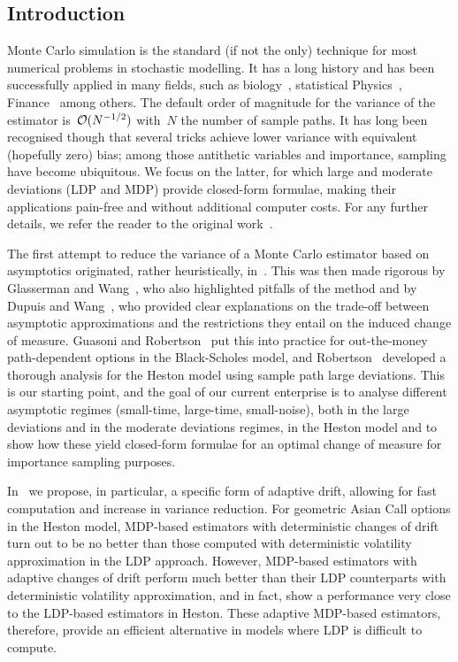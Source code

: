 \subsection{Introduction}
Monte Carlo simulation is the  standard (if not the only) technique for most numerical problems in stochastic modelling.
It has a long history and has been successfully applied in many fields, such as biology~\cite{Manly2018RandomizationBiology}, statistical Physics~\cite{Binder2012MontePhysics}, Finance~\cite{Glasserman1997CounterexamplesProbabilities} among others.
The default order of magnitude for the variance of the estimator is~$\mathcal{O}(N^{-1/2})$ with~$N$ the number of sample paths.
It has long been recognised though that several tricks achieve lower variance with equivalent (hopefully zero) bias; among those antithetic variables and importance, sampling have become ubiquitous.
We focus on the latter, for which large and moderate deviations (LDP and MDP) provide closed-form formulae, 
making their applications pain-free and without additional computer costs. For any further details, we refer the reader to the original work~\cite{Geha2023LargeModel}.

The first attempt to reduce the variance of a Monte Carlo estimator based on asymptotics originated, rather heuristically, in~\cite{Siegmund1976ImportanceTests}. 
This was then made rigorous by Glasserman and Wang~\cite{Glasserman1997CounterexamplesProbabilities}, who also highlighted pitfalls of the method and by Dupuis and Wang~\cite{Dupuis2004ImportanceGames}, who provided clear explanations on the trade-off between asymptotic approximations and the restrictions they entail on the induced change of measure.
Guasoni and Robertson~\cite{Guasoni2007OptimalTime} 
put this into practice for out-the-money path-dependent options in the Black-Scholes model,
and Robertson~\cite{Robertson2010SampleModels} developed a thorough analysis for the Heston model using sample path large deviations.
This is our starting point,
and the goal of our current enterprise is to analyse different asymptotic regimes 
(small-time, large-time, small-noise),
both in the large deviations and in the moderate deviations regimes, in the Heston model 
and to show how these yield closed-form formulae for an optimal change of measure for importance sampling purposes.

In~\cite{Geha2023LargeModel} we propose, in particular, a specific form of adaptive drift, allowing for fast computation
and increase in variance reduction.
For  geometric Asian Call options in the Heston model, MDP-based estimators with deterministic changes of drift turn out to be no better than those computed with deterministic volatility approximation in the LDP approach. 
However, MDP-based estimators with adaptive changes of drift perform much better than their LDP counterparts with deterministic volatility approximation, 
and in fact, show a performance very close to the LDP-based estimators in Heston. 
These adaptive MDP-based estimators, therefore, provide an efficient alternative in models where 
LDP is difficult to compute.

